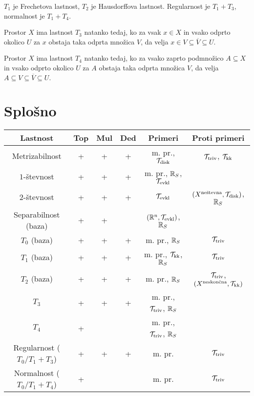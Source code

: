\begin{opomba}
    $T_1$ je Frechetova lastnost, $T_2$ je Hausdorffova lastnost. Regularnost je $T_1 + T_3$, normalnost je $T_1 + T_4$.
\end{opomba}

\begin{trditev}
    Prostor $X$ ima lastnost $T_3$ natanko tedaj, ko za vsak $x \in X$ in vsako odprto okolico $U$ za $x$ obstaja taka odprta množica $V$, da velja $x \in V \subseteq \overline{V} \subseteq U$.
\end{trditev}

\begin{trditev}
    Prostor $X$ ima lastnost $T_4$ natanko tedaj, ko za vsako zaprto podmnožico $A \subseteq X$ in vsako odprto okolico $U$ za $A$ obstaja taka odprta množica $V$, da velja $A \subseteq V \subseteq \overline{V} \subseteq U$.
\end{trditev}

\section{Splošno}

\begin{center}
    \begin{tabular}{ |c| c |c| c| c| c | }
    \hline
     Lastnost & Top & Mul & Ded & Primeri & Proti primeri\\ \hline
     Metrizabilnost & + & + & + & m. pr., $\mathcal{T}_{\text{disk}}$ & $\mathcal{T}_{\text{triv}}$, $\mathcal{T}_\text{kk}$ \\ \hline
     $1$-števnost & + & + & + & m. pr., $\mathbb{R}_S$, $\mathcal{T}_{\text{evkl}}$ &  \\ \hline
     $2$-števnost & + & + & + & $\mathcal{T}_{\text{evkl}}$ & $(X^\text{neštevna}, \mathcal{T}_{\text{disk}})$, $\mathbb{R}_S$ \\ \hline
     Separabilnost (baza) & + & + &  & $(\mathbb{R}^n, \mathcal{T}_{\text{evkl}})$, $\mathbb{R}_S$ & \\ \hline  
     $T_0$ (baza) & + & + & + & m. pr., $\mathbb{R}_S$ & $\mathcal{T}_{\text{triv}}$ \\ \hline
     $T_1$ (baza) & + & + & + & m. pr., $\mathcal{T}_{\text{kk}}$, $\mathbb{R}_S$ & $\mathcal{T}_{\text{triv}}$ \\ \hline
     $T_2$ (baza) & + & + & + & m. pr., $\mathbb{R}_S$ & $\mathcal{T}_{\text{triv}}$, $(X^\text{neskončna}, \mathcal{T}_{\text{kk}})$ \\ \hline
     $T_3$ & + & + & + & m. pr., $\mathcal{T}_{\text{triv}}$, $\mathbb{R}_S$ &   \\ \hline
     $T_4$ & + & &  & m. pr., $\mathcal{T}_{\text{triv}}$, $\mathbb{R}_S$ &  \\ \hline
     Regularnost ($T_0/T_1 + T_3$) & + & + & + & m. pr. & $\mathcal{T}_{\text{triv}}$ \\ \hline
     Normalnost ($T_0/T_1 + T_4$) & + & &  & m. pr. & $\mathcal{T}_{\text{triv}}$ \\ \hline
    \end{tabular}
\end{center}